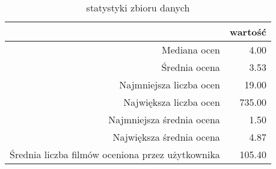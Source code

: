 \begin{table}[ht]
\centering
\begin{tabular}{rr}
  \hline
 & wartość \\ 
  \hline
Mediana ocen & 4.00 \\ 
  Średnia ocena & 3.53 \\ 
  Najmniejsza liczba ocen & 19.00 \\ 
  Największa liczba ocen & 735.00 \\ 
  Najmniejsza średnia ocena & 1.50 \\ 
  Największa średnia ocena & 4.87 \\ 
  Średnia liczba filmów oceniona przez użytkownika & 105.40 \\ 
   \hline
\end{tabular}
\caption{statystyki zbioru danych} 
\end{table}

